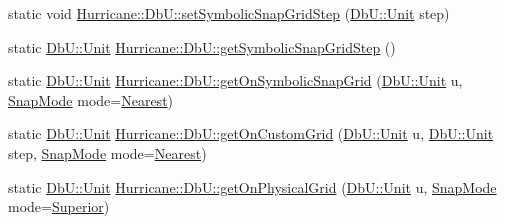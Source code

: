 \begin{DoxyCompactItemize}
static void \hyperlink{group__DbUGroup_ga9ccd423c8f268ef54770f4663e6c9304}{Hurricane\+::\+Db\+U\+::set\+Symbolic\+Snap\+Grid\+Step} (\hyperlink{group__DbUGroup_ga4fbfa3e8c89347af76c9628ea06c4146}{Db\+U\+::\+Unit} step)
\item 
static \hyperlink{group__DbUGroup_ga4fbfa3e8c89347af76c9628ea06c4146}{Db\+U\+::\+Unit} \hyperlink{group__DbUGroup_ga687a9134729b107c42fb7f69596c4c3b}{Hurricane\+::\+Db\+U\+::get\+Symbolic\+Snap\+Grid\+Step} ()
\item 
static \hyperlink{group__DbUGroup_ga4fbfa3e8c89347af76c9628ea06c4146}{Db\+U\+::\+Unit} \hyperlink{group__DbUGroup_gad1b0c0f3680093cf5a63d901312c925d}{Hurricane\+::\+Db\+U\+::get\+On\+Symbolic\+Snap\+Grid} (\hyperlink{group__DbUGroup_ga4fbfa3e8c89347af76c9628ea06c4146}{Db\+U\+::\+Unit} u, \hyperlink{group__DbUGroup_ga1082168d6f9956ebba22ab8bbec21637}{Snap\+Mode} mode=\hyperlink{group__DbUGroup_gga1082168d6f9956ebba22ab8bbec21637a65e6f47eb16779b8974a80d6145a2db5}{Nearest})
\item 
static \hyperlink{group__DbUGroup_ga4fbfa3e8c89347af76c9628ea06c4146}{Db\+U\+::\+Unit} \hyperlink{group__DbUGroup_ga87323d9038656dceabffc37d45de408a}{Hurricane\+::\+Db\+U\+::get\+On\+Custom\+Grid} (\hyperlink{group__DbUGroup_ga4fbfa3e8c89347af76c9628ea06c4146}{Db\+U\+::\+Unit} u, \hyperlink{group__DbUGroup_ga4fbfa3e8c89347af76c9628ea06c4146}{Db\+U\+::\+Unit} step, \hyperlink{group__DbUGroup_ga1082168d6f9956ebba22ab8bbec21637}{Snap\+Mode} mode=\hyperlink{group__DbUGroup_gga1082168d6f9956ebba22ab8bbec21637a65e6f47eb16779b8974a80d6145a2db5}{Nearest})
\item 
static \hyperlink{group__DbUGroup_ga4fbfa3e8c89347af76c9628ea06c4146}{Db\+U\+::\+Unit} \hyperlink{group__DbUGroup_ga9419025221579f4277475c65655be3dc}{Hurricane\+::\+Db\+U\+::get\+On\+Physical\+Grid} (\hyperlink{group__DbUGroup_ga4fbfa3e8c89347af76c9628ea06c4146}{Db\+U\+::\+Unit} u, \hyperlink{group__DbUGroup_ga1082168d6f9956ebba22ab8bbec21637}{Snap\+Mode} mode=\hyperlink{group__DbUGroup_gga1082168d6f9956ebba22ab8bbec21637a8ce92cf7ff7627c46baf85612f9ad847}{Superior})
\end{DoxyCompactItemize}
